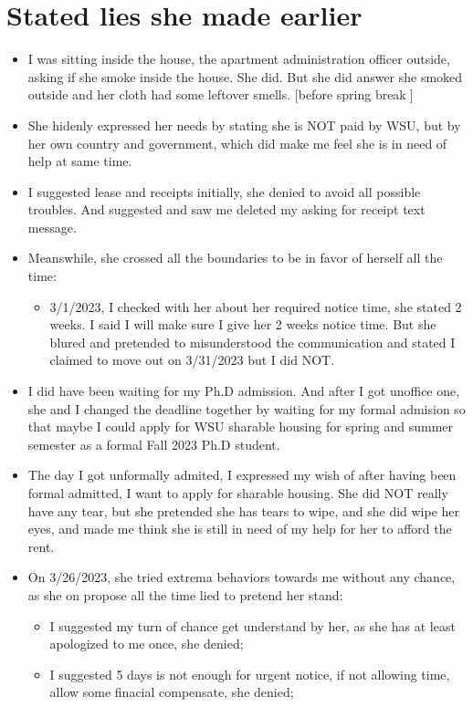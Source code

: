 \documentclass[9pt, b5paper]{article}
\begin{document}
\section{Stated lies she made earlier}
\label{sec-9}
\begin{itemize}
\item I was sitting inside the house, the apartment administration officer outside, asking if she smoke inside the house. She did. But she did answer she smoked outside and her cloth had some leftover smells. [before spring break]
\item She hidenly expressed her needs by stating she is NOT paid by WSU, but by her own country and government, which did make me feel she is in need of help at same time.
\item I suggested lease and receipts initially, she denied to avoid all possible troubles. And suggested and saw me deleted my asking for receipt text message.
\item Meanswhile, she crossed all the boundaries to be in favor of herself all the time: 
\begin{itemize}
\item 3/1/2023, I checked with her about her required notice time, she stated 2 weeks. I said I will make sure I give her 2 weeks notice time. But she blured and pretended to misunderstood the communication and stated I claimed to move out on 3/31/2023 but I did NOT.
\end{itemize}
\item I did have been waiting for my Ph.D admission. And after I got unoffice one, she and I changed the deadline together by waiting for my formal admision so that maybe I could apply for WSU sharable housing for spring and summer semester as a formal Fall 2023 Ph.D student.
\item The day I got unformally admited, I expressed my wish of after having been formal admitted, I want to apply for sharable housing. She did NOT really have any tear, but she pretended she has tears to wipe, and she did wipe her eyes, and made me think she is still in need of my help for her to afford the rent.
\item On 3/26/2023, she tried extrema behaviors towards me without any chance, as she on propose all the time lied to pretend her stand:
\begin{itemize}
\item I suggested my turn of chance get understand by her, as she has at least apologized to me once, she denied;
\item I suggested 5 days is not enough for urgent notice, if not allowing time, allow some finacial compensate, she denied;

\end{itemize}
\end{itemize}
\end{document}

